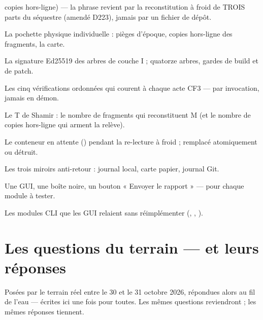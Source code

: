 \begin{description}[style=nextline, leftmargin=1.2em]
copies hors-ligne) — la phrase revient par la reconstitution à froid de TROIS
parts du séquestre (amendé D223), jamais par un fichier de dépôt.
\item[sachet] La pochette physique individuelle : pièges d'époque, copies hors-ligne
des fragments, la carte.
\item[sceau de l'Intention] La signature Ed25519 des arbres de couche I ; quatorze arbres,
gardes de build et de patch.
\item[sentinelle instantanée] Les cinq vérifications ordonnées qui courent à chaque
acte CF3 — par invocation, jamais en démon.
\item[seuil] Le T de Shamir : le nombre de fragments qui reconstituent M (et le nombre
de copies hors-ligne qui arment la relève).
\item[staging] Le conteneur en attente () pendant la
re-lecture à froid ; remplacé atomiquement ou détruit.
\item[témoins d'époque] Les trois miroirs anti-retour : journal local, carte papier,
journal Git.
\item[trio D122] Une GUI, une boîte noire, un bouton « Envoyer le rapport » — pour
chaque module à tester.
\item[vérités vivantes] Les modules CLI que les GUI relaient sans réimplémenter
(, , ).
\end{description}

\section{Les questions du terrain — et leurs réponses}\label{sec:faq}

Posées par le terrain réel entre le 30 et le 31 octobre 2026, répondues alors au fil
de l'eau — écrites ici une fois pour toutes. Les mêmes questions reviendront ; les
mêmes réponses tiennent.

